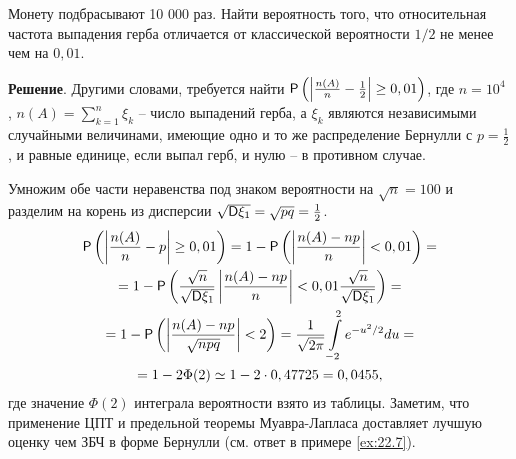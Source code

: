 \begin{example}
\label{ex:26.7}
Монету подбрасывают 10 000 раз. Найти вероятность того, что относительная частота выпадения герба отличается от классической вероятности $1/2$ не менее чем на $0,01$.


\textbf{Решение}. Другими словами, требуется найти $\P\left(\left|\frac{n(A)}{n}-\frac{1}{2}\right|\geq0,01\right)$, где $n = 10^4$ , $n(A) =
\sum\limits_{k=1}^n \xi_k$ -- число выпадений герба, а $\xi_k$ являются независимыми случайными величинами, имеющие одно и то же распределение
Бернулли с $p = \frac{1}{2}$, и равные единице, если выпал герб, и нулю -- в противном случае. 

Умножим обе части неравенства под знаком вероятности на $\sqrt{n} = 100$ и разделим на корень из дисперсии $\sqrt{\D\xi_1} = \sqrt{pq} = \frac{1}{2}$.
\begin{gather*}
	\P\left(
		\left|
			\frac{n(A)}{n}-p
		\right|\geq0,01
	\right)=
	1-\P\left(
		\left|
			\frac{n(A)-np}{n}
		\right|<0,01
	\right)=\\=
	1-\P\left(
		\frac{\sqrt{n}}{\sqrt{\D\xi_1}}
		\left|
			\frac{n(A)-np}{n}
		\right|<0,01\frac{\sqrt{n}}{\sqrt{\D\xi_1}}
	\right)=\\=
	1-\P\left(
		\left|
			\frac{n(A)-np}{\sqrt{npq}}
		\right|<2
	\right)=
	\frac{1}{\sqrt{2\pi}}\int\limits_{-2}^2 e^{-u^2/2} du=\\=
	1-2\Phi(2)\simeq 1 - 2 \cdot 0,47725 = 0,0455,
\end{gather*}
где значение $\Phi(2)$ интеграла вероятности взято из таблицы. Заметим,
что применение ЦПТ и предельной теоремы Муавра-Лапласа доставляет
лучшую оценку чем ЗБЧ в форме Бернулли (см. ответ в примере \ref{ex:22.7}).

\end{example}
